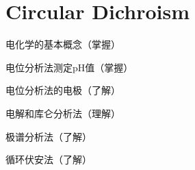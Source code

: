 \chapter{Circular Dichroism}

\begin{introduction}
	\item 电化学的基本概念（掌握）
	\item 电位分析法测定pH值（掌握）
	\item 电位分析法的电极（了解）
	\item 电解和库仑分析法（理解）
	\item 极谱分析法（了解）
	\item 循环伏安法（了解）
\end{introduction}

